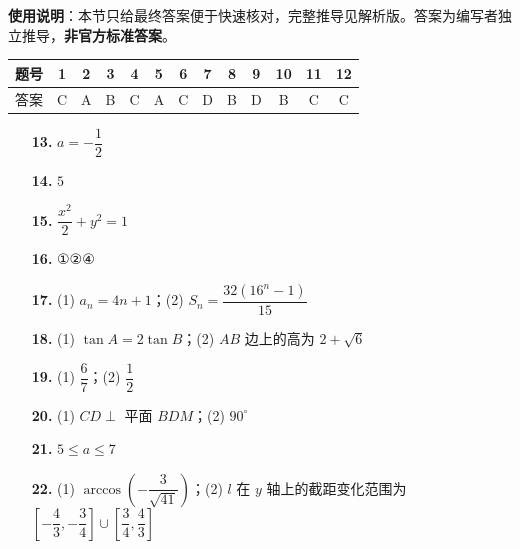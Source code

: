 
\begin{gknotice}
\textbf{使用说明}：本节只给最终答案便于快速核对，完整推导见解析版。答案为编写者独立推导，\textbf{非官方标准答案}。
\end{gknotice}

\begin{center}\begin{tabular}{ccccccccccccc}
\toprule
题号 & 1 & 2 & 3 & 4 & 5 & 6 & 7 & 8 & 9 & 10 & 11 & 12 \\
\midrule
答案 & C & A & B & C & A & C & D & B & D & B & C & C \\
\bottomrule
\end{tabular}\end{center}

\begin{itemize}[leftmargin=2.6em]
  \item[\textbf{13.}] $a=-\dfrac12$
  \item[\textbf{14.}] $5$
  \item[\textbf{15.}] $\dfrac{x^2}{2}+y^2=1$
  \item[\textbf{16.}] ①②④
\end{itemize}

\begin{itemize}[leftmargin=2.6em]
  \item[\textbf{17.}] (1) $a_n=4n+1$；(2) $S_n=\dfrac{32(16^n-1)}{15}$
  \item[\textbf{18.}] (1) $\tan A=2\tan B$；(2) $AB$ 边上的高为 $2+\sqrt6$
  \item[\textbf{19.}] (1) $\dfrac67$；(2) $\dfrac12$
  \item[\textbf{20.}] (1) $CD\perp$ 平面 $BDM$；(2) $90^\circ$
  \item[\textbf{21.}] $5\leqslant a\leqslant7$
  \item[\textbf{22.}] (1) $\arccos\left(-\dfrac3{\sqrt{41}}\right)$；(2) $l$ 在 $y$ 轴上的截距变化范围为 $\left[-\dfrac43,-\dfrac34\right]\cup\left[\dfrac34,\dfrac43\right]$
\end{itemize}
